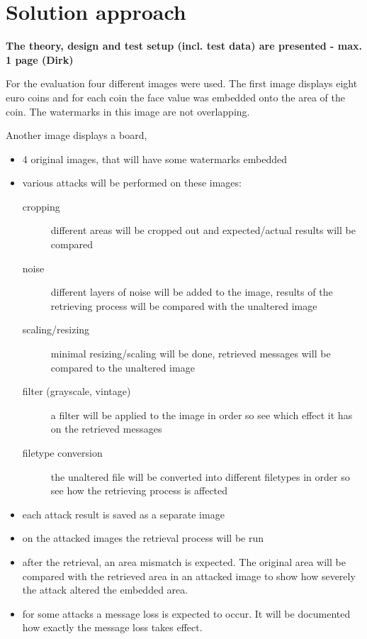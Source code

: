 \section{Solution approach} 
\textbf{The theory, design and test setup (incl. test data) are presented - max. 1 page (Dirk)}

For the evaluation four different images were used. The first image displays eight euro coins and for each coin 
the face value was embedded onto the area of the coin. The watermarks in this image are not overlapping. 

\begin{figure*}[t]
\centerline{\texttt{[image: ]}
\label{stuff}
\end{figure*}
Another image displays a board,

\begin{itemize}
    \item 4 original images, that will have some watermarks embedded
    \item various attacks will be performed on these images:
    \begin{description}
	    \item[cropping] different areas will be cropped out and expected/actual results will be compared
        \item[noise] different layers of noise will be added to the image, results of the retrieving process will be compared with the unaltered image
        \item[scaling/resizing] minimal resizing/scaling will be done, retrieved messages will be compared to the unaltered image
	    \item[filter (grayscale, vintage)] a filter will be applied to the image in order so see which effect it has on the retrieved messages
        \item[filetype conversion] the unaltered file will be converted into different filetypes in order so see how the retrieving process is affected
    \end{description}
    \item each attack result is saved as a separate image
    \item on the attacked images the retrieval process will be run
    \item after the retrieval, an area mismatch is expected. The original area will be compared with the retrieved area in an attacked image to show how severely the attack altered the embedded area.
    \item for some attacks a message loss is expected to occur. It will be documented how exactly the message loss takes effect. 

\end{itemize}
